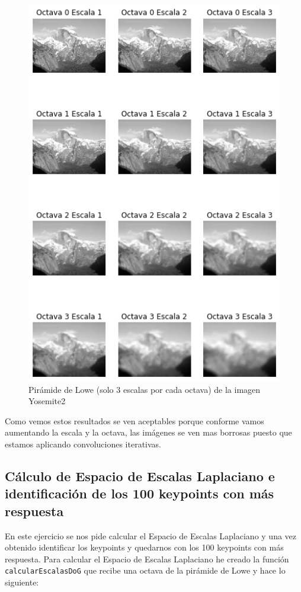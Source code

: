 \documentclass[12pt,spanish]{article}
\begin{document}
\begin{figure}[H]
	\centering
	\includegraphics[width=12cm]{./imagenes_memoria/octavas_escalas2.png}
	\caption{Pirámide de Lowe (solo 3 escalas por cada octava) de la imagen Yosemite2}
	\label{octavas_escalas2}
\end{figure}

Como vemos estos resultados se ven aceptables porque conforme vamos aumentando la escala y la octava, las imágenes se ven mas borrosas puesto que estamos aplicando convoluciones iterativas.

\subsection{Cálculo de Espacio de Escalas Laplaciano e identificación de los 100 keypoints con más respuesta}
En este ejercicio se nos pide calcular el Espacio de Escalas Laplaciano y una vez obtenido identificar los keypoints y quedarnos con los 100 keypoints con más respuesta. Para calcular el Espacio de Escalas Laplaciano he creado la función \texttt{calcularEscalasDoG} que recibe una octava de la pirámide de Lowe y hace lo siguiente:
\end{document}
